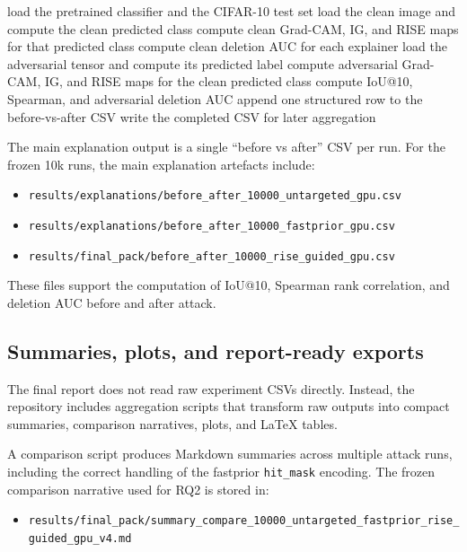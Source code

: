 \begin{algorithm}[tbp]
\caption{Explanation and metric export pipeline}
\label{alg:explanation_runner}
\begin{algorithmic}
    \State load the pretrained classifier and the CIFAR-10 test set
        \State load the clean image and compute the clean predicted class
        \State compute clean Grad-CAM, IG, and RISE maps for that predicted class
        \State compute clean deletion AUC for each explainer
            \State load the adversarial tensor and compute its predicted label
            \State compute adversarial Grad-CAM, IG, and RISE maps for the clean predicted class
            \State compute IoU@10, Spearman, and adversarial deletion AUC
        \EndIf
        \State append one structured row to the before-vs-after CSV
    \EndFor
    \State write the completed CSV for later aggregation
\EndProcedure
\end{algorithmic}
\end{algorithm}

The main explanation output is a single ``before vs after'' CSV per run. For the frozen 10k
runs, the main explanation artefacts include:
\begin{itemize}
  \item \texttt{results/explanations/before\_after\_10000\_untargeted\_gpu.csv}
  \item \texttt{results/explanations/before\_after\_10000\_fastprior\_gpu.csv}
  \item \texttt{results/final\_pack/before\_after\_10000\_rise\_guided\_gpu.csv}
\end{itemize}
These files support the computation of IoU@10, Spearman rank correlation, and deletion AUC
before and after attack.

\subsection{Summaries, plots, and report-ready exports}
The final report does not read raw experiment CSVs directly. Instead, the repository includes
aggregation scripts that transform raw outputs into compact summaries, comparison narratives,
plots, and \LaTeX{} tables.

A comparison script produces Markdown summaries across multiple attack runs, including the
correct handling of the fastprior \texttt{hit\_mask} encoding. The frozen comparison narrative
used for RQ2 is stored in:
\begin{itemize}
  \item \texttt{results/final\_pack/summary\_compare\_10000\_untargeted\_fastprior\_rise\_guided\_gpu\_v4.md}
\end{itemize}

